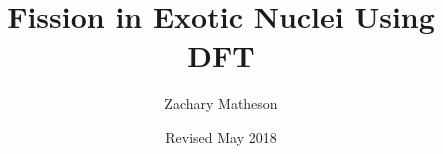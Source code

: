 \documentclass[a4paper,12pt]{book}
\begin{document}
\author{Zachary Matheson}
\title{Fission in Exotic Nuclei Using DFT}
\date{Revised May 2018}

\frontmatter
\maketitle
\tableofcontents

\mainmatter


\backmatter


\end{document}
